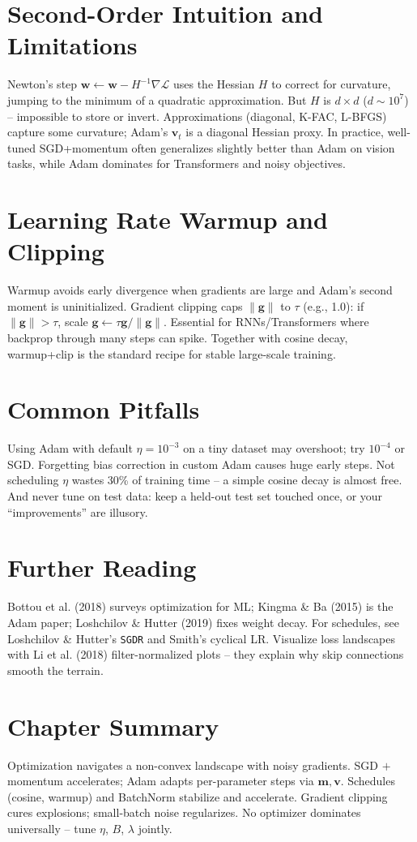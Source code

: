 \section{Second-Order Intuition and Limitations}
Newton's step $\mathbf{w}\leftarrow\mathbf{w}-H^{-1}\nabla\mathcal{L}$ uses the
Hessian $H$ to correct for curvature, jumping to the minimum of a quadratic
approximation. But $H$ is $d\times d$ ($d\sim10^7$) -- impossible to store or
invert. Approximations (diagonal, K-FAC, L-BFGS) capture some curvature; Adam's
$\mathbf{v}_t$ is a diagonal Hessian proxy. In practice, well-tuned SGD+momentum
often generalizes slightly better than Adam on vision tasks, while Adam dominates
for Transformers and noisy objectives.

\section{Learning Rate Warmup and Clipping}
Warmup avoids early divergence when gradients are large and Adam's second moment
is uninitialized. Gradient clipping caps $\|\mathbf{g}\|$ to $\tau$ (e.g., 1.0):
if $\|\mathbf{g}\|>\tau$, scale $\mathbf{g}\leftarrow\tau\mathbf{g}/\|\mathbf{g}\|$.
Essential for RNNs/Transformers where backprop through many steps can spike.
Together with cosine decay, warmup+clip is the standard recipe for stable
large-scale training.

\section{Common Pitfalls}
Using Adam with default $\eta=10^{-3}$ on a tiny dataset may overshoot; try
$10^{-4}$ or SGD. Forgetting bias correction in custom Adam causes huge early
steps. Not scheduling $\eta$ wastes 30\% of training time -- a simple cosine
decay is almost free. And never tune on test data: keep a held-out test set
touched once, or your ``improvements'' are illusory.

\section{Further Reading}
Bottou et al. (2018) surveys optimization for ML; Kingma \& Ba (2015) is the
Adam paper; Loshchilov \& Hutter (2019) fixes weight decay. For schedules, see
Loshchilov \& Hutter's \texttt{SGDR} and Smith's cyclical LR. Visualize loss
landscapes with Li et al. (2018) filter-normalized plots -- they explain why
skip connections smooth the terrain.

\section{Chapter Summary}
Optimization navigates a non-convex landscape with noisy gradients. SGD $+$
momentum accelerates; Adam adapts per-parameter steps via $\mathbf{m},\mathbf{v}$.
Schedules (cosine, warmup) and BatchNorm stabilize and accelerate. Gradient
clipping cures explosions; small-batch noise regularizes. No optimizer dominates
universally -- tune $\eta$, $B$, $\lambda$ jointly.

